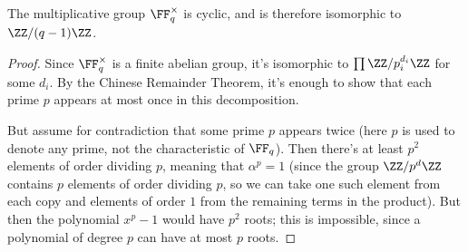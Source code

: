 \begin{proposition}
The multiplicative group $\FF_q^\times$ is cyclic, and is therefore isomorphic to $\ZZ/(q - 1)\ZZ$. 
\end{proposition}

\begin{proof}
Since $\FF_q^\times$ is a finite abelian group, it's isomorphic to $\prod \ZZ/p_i^{d_i}\ZZ$ for some $d_i$. By the Chinese Remainder Theorem, it's enough to show that each prime $p$ appears at most once in this decomposition. 

But assume for contradiction that some prime $p$ appears twice (here $p$ is used to denote any prime, not the characteristic of $\FF_q$). Then there's at least $p^2$ elements of order dividing $p$, meaning that $\alpha^p = 1$ (since the group $\ZZ/p^d\ZZ$ contains $p$ elements of order dividing $p$, so we can take one such element from each copy and elements of order $1$ from the remaining terms in the product). But then the polynomial $x^p - 1$ would have $p^2$ roots; this is impossible, since a polynomial of degree $p$ can have at most $p$ roots.  
\end{proof}



